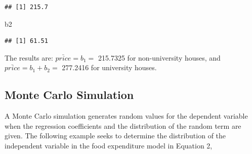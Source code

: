 \documentclass[
]{book}
\newenvironment{Shaded}{\begin{snugshade}}{\end{snugshade}}
\newcommand{\NormalTok}[1]{#1}
\begin{document}
\begin{verbatim}
## [1] 215.7
\end{verbatim}

\begin{Shaded}
\begin{Highlighting}[]
\NormalTok{b2}
\end{Highlighting}
\end{Shaded}

\begin{verbatim}
## [1] 61.51
\end{verbatim}

The results are: \(\bar{price}=b_1=\) 215.7325 for non-university houses, and \(\bar{price}=b_1+b_2=\) 277.2416 for university houses.

\hypertarget{monte-carlo-simulation}{%
\subsection{Monte Carlo Simulation}\label{monte-carlo-simulation}}

A Monte Carlo simulation generates random values for the dependent variable when the regression coefficients and the distribution of the random term are given. The following example seeks to determine the distribution of the independent variable in the food expenditure model in Equation 2,
\end{document}

